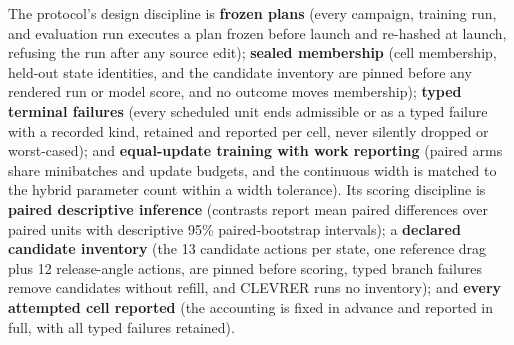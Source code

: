 The protocol's design discipline is \textbf{frozen plans} (every campaign, training run, and evaluation run executes a plan frozen before launch and re-hashed at launch, refusing the run after any source edit); \textbf{sealed membership} (cell membership, held-out state identities, and the candidate inventory are pinned before any rendered run or model score, and no outcome moves membership); \textbf{typed terminal failures} (every scheduled unit ends admissible or as a typed failure with a recorded kind, retained and reported per cell, never silently dropped or worst-cased); and \textbf{equal-update training with work reporting} (paired arms share minibatches and update budgets, and the continuous width is matched to the hybrid parameter count within a width tolerance). Its scoring discipline is \textbf{paired descriptive inference} (contrasts report mean paired differences over paired units with descriptive 95\% paired-bootstrap intervals); a \textbf{declared candidate inventory} (the 13 candidate actions per state, one reference drag plus 12 release-angle actions, are pinned before scoring, typed branch failures remove candidates without refill, and CLEVRER runs no inventory); and \textbf{every attempted cell reported} (the accounting is fixed in advance and reported in full, with all typed failures retained).


